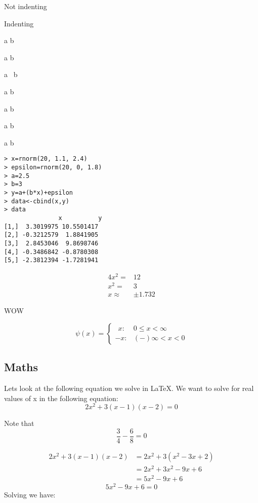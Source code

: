 \documentclass[12pt]{article}  %
\begin{document}
\noindent Not indenting

Indenting




a b

a   b

a \, b

a \; b

a \quad b

a \vspace{2cm} b

a \vspace{3in} b



\begin{verbatim}
> x=rnorm(20, 1.1, 2.4)
> epsilon=rnorm(20, 0, 1.8)
> a=2.5
> b=3
> y=a+(b*x)+epsilon
> data<-cbind(x,y)
> data
               x          y
[1,]  3.3019975 10.5501417
[2,] -0.3212579  1.8841905
[3,]  2.8453046  9.8698746
[4,] -0.3486842 -0.8780308
[5,] -2.3812394 -1.7281941
\end{verbatim}


\begin{eqnarray*}
4x^2=& 12\\
x^2 =& 3\\
x   \approx& \pm 1.732
\end{eqnarray*}

\begin{large}
WOW
\end{large}

\begin{displaymath}
\psi(x) = \left\{
			\begin{array}{lr}
				
				\ \ x  : &  0 \leq x < \infty \\
			   -x : &  (-)\infty < x < 0   
				
			\end{array}		 
		 \right.			
\end{displaymath}


	\subsection{Maths}
Lets look at the following equation we solve in \LaTeX. 
We want to solve for real values of x in the following equation:
\[
2x^2+3(x-1)(x-2)=0
\]


Note that
\[
\dfrac{3}{4}-\dfrac{6}{8}=0
\]


\begin{align*}
2x^2 + 3(x-1)(x-2) &= 2x^2 + 3(x^2 - 3x + 2)\\
				   &= 2x^2 + 3x^2 - 9x + 6\\
				   &= 5x^2 - 9x + 6
\end{align*}
\[
5x^2 - 9x + 6 = 0
\]
Solving we have:
\end{document}
